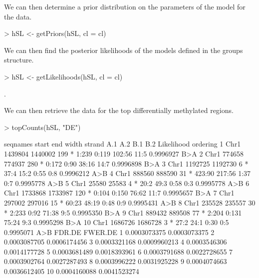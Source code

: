 \documentclass[a4paper]{article}
\begin{document}
We can then determine a prior distribution on the parameters of the model for the data.
\begin{Schunk}
\begin{Sinput}
> hSL <- getPriors(hSL, cl = cl)
\end{Sinput}
\end{Schunk}

We can then find the posterior likelihoods of the models defined in the groups structure.

\begin{Schunk}
\begin{Sinput}
> hSL <- getLikelihoods(hSL, cl = cl)
\end{Sinput}
\begin{Soutput}
.
\end{Soutput}
\end{Schunk}

We can then retrieve the data for the top differentially methylated regions.

\begin{Schunk}
\begin{Sinput}
> topCounts(hSL, "DE")
\end{Sinput}
\begin{Soutput}
   seqnames   start     end width strand    A.1    A.2    B.1  B.2 Likelihood ordering
1      Chr1 1439804 1440002   199      *  1:239  0:119 102:56 11:5  0.9996927      B>A
2      Chr1  774658  774937   280      *  0:172   0:90  38:16 14:7  0.9996898      B>A
3      Chr1 1192725 1192730     6      *   37:4   15:2   0:55  0:8  0.9996212      A>B
4      Chr1  888560  888590    31      * 423:90 217:56   1:37  0:7  0.9995778      A>B
5      Chr1   25580   25583     4      *   20:2   49:3   0:58  0:3  0.9995778      A>B
6      Chr1 1733868 1733987   120      *  0:104  0:150  76:62 11:7  0.9995657      B>A
7      Chr1  297002  297016    15      *  60:23  48:19   0:48  0:9  0.9995431      A>B
8      Chr1  235528  235557    30      *  2:233   0:92  71:38  9:5  0.9995350      B>A
9      Chr1  889432  889508    77      *  2:204  0:131  75:24  9:3  0.9995298      B>A
10     Chr1 1686726 1686728     3      *   27:2   24:1   0:30  0:5  0.9995071      A>B
         FDR.DE      FWER.DE
1  0.0003073375 0.0003073375
2  0.0003087705 0.0006174456
3  0.0003321168 0.0009960213
4  0.0003546306 0.0014177728
5  0.0003681489 0.0018393961
6  0.0003791688 0.0022728655
7  0.0003902764 0.0027287493
8  0.0003996222 0.0031925228
9  0.0004074663 0.0036612405
10 0.0004160088 0.0041523274
\end{Soutput}
\end{Schunk}
\end{document}
